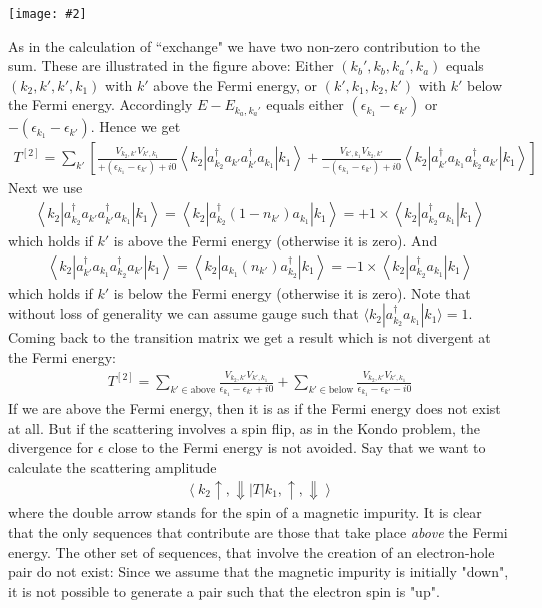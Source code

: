 \documentclass[onecolumn,fleqn, 11pt]{revtex4}
\newcommand{\tbox}[1]{\text{#1}}
\newcommand{\putgraph}[2][0.30\hsize]{\texttt{[image: \#2]}}
\newcommand{\beq}{\begin{eqnarray}}
\newcommand{\eeq}{\end{eqnarray}}
\begin{document}
\begin{center}
\putgraph[0.6\hsize]{kondo}
\end{center}


As in the calculation of ``exchange" 
we have two non-zero contribution to the sum.
These are illustrated in the figure above:  
Either  $(k_b',k_b,k_a',k_a)$ equals 
$(k_2,k',k',k_1)$ with $k'$ above the Fermi 
energy, or $(k',k_1,k_2,k')$ with $k'$ below 
the Fermi energy. Accordingly $E-E_{k_a,k_a'}$ 
equals either ${(\epsilon_{k_1}-\epsilon_{k'})}$ 
or  ${-(\epsilon_{k_1}-\epsilon_{k'})}$. Hence we get
\beq
T^{[2]}
=  \sum_{k'}
\left[
\frac{ V_{k_2,k'} V_{k',k_1} }{+(\epsilon_{k_1}-\epsilon_{k'})+i0}
\left\langle k_{2} \left| 
a^{\dag}_{k_2}  a_{k'}
a^{\dag}_{k'}  a_{k_1}
\right|k_{1}\right\rangle
+
\frac{ V_{k',k_1} V_{k_2,k'} }{-(\epsilon_{k_1}-\epsilon_{k'})+i0}
\left\langle k_{2} \left| 
a^{\dag}_{k'}  a_{k_1}
a^{\dag}_{k_2}  a_{k'}
\right|k_{1}\right\rangle
\right]
\eeq
Next we use 
\beq 
\left\langle k_{2} \left| 
a^{\dag}_{k_2}  a_{k'}
a^{\dag}_{k'}  a_{k_1}
\right|k_{1}\right\rangle 
=
\left\langle k_{2} \left| 
a^{\dag}_{k_2} (1-n_{k'}) a_{k_1}
\right|k_{1}\right\rangle 
= 
+1 \times  
\left\langle k_{2} \left| 
a^{\dag}_{k_2}a_{k_1}
\right|k_{1}\right\rangle 
\eeq
which holds if $k'$ is above the Fermi energy 
(otherwise it is zero).  And 
\beq 
\left\langle k_{2} \left| 
a^{\dag}_{k'}  a_{k_1}
a^{\dag}_{k_2}  a_{k'}
\right|k_{1}\right\rangle
= 
\left\langle k_{2} \left| 
a_{k_1} ( n_{k'} ) a^{\dag}_{k_2} 
\right|k_{1}\right\rangle
= 
-1 \times 
\left\langle k_{2} \left| 
a^{\dag}_{k_2}a_{k_1}
\right|k_{1}\right\rangle 
\eeq
which holds if $k'$ is below the Fermi energy 
(otherwise it is zero). Note that without 
loss of generality we can assume gauge 
such that ${\langle k_{2}| a^{\dag}_{k_2}a_{k_1}|k_{1}\rangle =1}$.
Coming back to the transition matrix we   
get a result which is not divergent at the Fermi energy: 
\beq
T^{[2]} = 
\sum_{k'\in \tbox{above}}
\frac{ V_{k_2,k'} V_{k',k_1} }{\epsilon_{k_1}-\epsilon_{k'}+i0}
+ 
\sum_{k'\in \tbox{below}}
\frac{ V_{k_2,k'} V_{k',k_1} }{\epsilon_{k_1}-\epsilon_{k'}-i0}
\eeq
If we are above the Fermi energy, 
then it is as if the Fermi energy does not exist at all. 
But if the scattering involves a spin flip, 
as in the Kondo problem, 
the divergence for $\epsilon$ close to the Fermi energy 
is not avoided. Say that we want to calculate 
the scattering amplitude   
\beq
\left\langle k_{2} \uparrow,\Downarrow\left|T\right|k_{1},\uparrow,\Downarrow\right\rangle
\eeq
where the double arrow stands for the spin of 
a magnetic impurity. It is clear that the only 
sequences that contribute are those that 
take place {\em above} the Fermi energy. 
The other set of sequences, that involve 
the creation of an electron-hole pair do not exist: 
Since we assume that the magnetic impurity 
is initially "down", it is not possible to 
generate a pair such that the electron spin is "up". 
\end{document}
